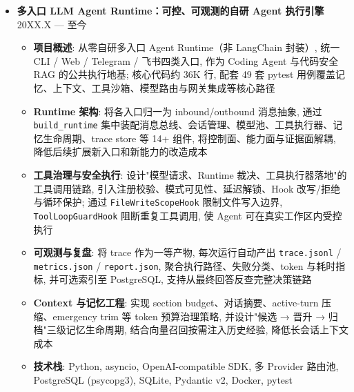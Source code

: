 \begin{itemize}
    \item \textbf{多入口 LLM Agent Runtime：可控、可观测的自研 Agent 执行引擎} \hfill 20XX.X --- 至今
    \begin{itemize}
        \item \textbf{项目概述}: 从零自研多入口 Agent Runtime（非 LangChain 封装）, 统一 CLI / Web / Telegram / 飞书四类入口, 作为 Coding Agent 与代码安全 RAG 的公共执行地基; 核心代码约 36K 行, 配套 49 套 pytest 用例覆盖记忆、上下文、工具沙箱、模型路由与网关集成等核心路径
        \item \textbf{Runtime 架构}: 将各入口归一为 inbound/outbound 消息抽象, 通过 \texttt{build\_runtime} 集中装配消息总线、会话管理、模型池、工具执行器、记忆生命周期、trace store 等 14+ 组件, 将控制面、能力面与证据面解耦, 降低后续扩展新入口和新能力的改造成本
        \item \textbf{工具治理与安全执行}: 设计"模型请求、Runtime 裁决、工具执行器落地"的工具调用链路, 引入注册校验、模式可见性、延迟解锁、Hook 改写/拒绝与循环保护; 通过 \texttt{FileWriteScopeHook} 限制文件写入边界, \texttt{ToolLoopGuardHook} 阻断重复工具调用, 使 Agent 可在真实工作区内受控执行
        \item \textbf{可观测与复盘}: 将 trace 作为一等产物, 每次运行自动产出 \texttt{trace.jsonl} / \texttt{metrics.json} / \texttt{report.json}, 聚合执行路径、失败分类、token 与耗时指标, 并可选索引至 PostgreSQL, 支持从最终回答反查完整决策链路
        \item \textbf{Context 与记忆工程}: 实现 section budget、对话摘要、active-turn 压缩、emergency trim 等 token 预算治理策略, 并设计"候选 → 晋升 → 归档"三级记忆生命周期, 结合向量召回按需注入历史经验, 降低长会话上下文成本
        \item \textbf{技术栈}: Python, asyncio, OpenAI-compatible SDK, 多 Provider 路由池, PostgreSQL (psycopg3), SQLite, Pydantic v2, Docker, pytest
    \end{itemize}


\end{itemize}
